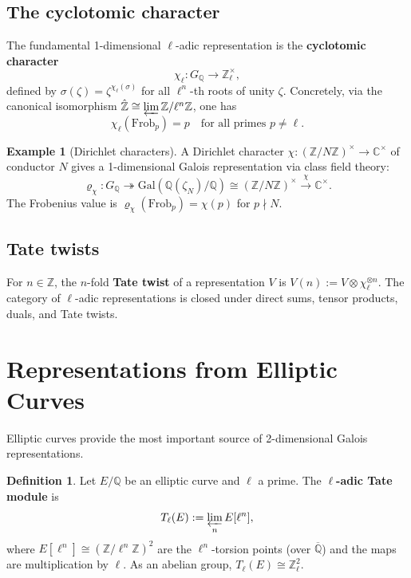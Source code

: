 \documentclass[a4paper,12pt]{amsart}
\theoremstyle{definition}
\newtheorem{definition}[theorem]{Definition}
\newtheorem{example}[theorem]{Example}
\theoremstyle{remark}
\newcommand{\Q}{\mathbb{Q}}
\newcommand{\Z}{\mathbb{Z}}
\newcommand{\Zl}{\mathbb{Z}_\ell}
\newcommand{\Qbar}{\overline{\mathbb{Q}}}
\newcommand{\Frob}{\mathrm{Frob}}
\newcommand{\Tl}{T_\ell}
\begin{document}
\subsection{The cyclotomic character}

The fundamental 1-dimensional $\ell$-adic representation is the \textbf{cyclotomic
character}
\[
  \chi_\ell\colon G_\Q \to \Zl^\times,
\]
defined by $\sigma(\zeta) = \zeta^{\chi_\ell(\sigma)}$ for all $\ell^n$-th roots of
unity $\zeta$. Concretely, via the canonical isomorphism
$\hat{\Z} \cong \varprojlim \Z/\ell^n\Z$, one has
\[
  \chi_\ell(\Frob_p) = p \quad \text{for all primes } p \neq \ell.
\]

\begin{example}[Dirichlet characters]
A Dirichlet character $\chi\colon (\Z/N\Z)^\times \to \mathbb{C}^\times$ of conductor
$N$ gives a 1-dimensional Galois representation via class field theory:
\[
  \varrho_\chi\colon G_\Q \twoheadrightarrow \mathrm{Gal}(\Q(\zeta_N)/\Q) \cong (\Z/N\Z)^\times
  \xrightarrow{\chi} \mathbb{C}^\times.
\]
The Frobenius value is $\varrho_\chi(\Frob_p) = \chi(p)$ for $p \nmid N$.
\end{example}

\subsection{Tate twists}

For $n \in \Z$, the $n$-fold \textbf{Tate twist} of a representation $V$ is
$V(n) := V \otimes \chi_\ell^{\otimes n}$. The category of $\ell$-adic representations
is closed under direct sums, tensor products, duals, and Tate twists.

\section{Representations from Elliptic Curves}
\label{sec:elliptic-curves}

Elliptic curves provide the most important source of 2-dimensional Galois representations.

\begin{definition}
Let $E/\Q$ be an elliptic curve and $\ell$ a prime. The \textbf{$\ell$-adic Tate
module} is
\[
  \Tl(E) := \varprojlim_n E[\ell^n],
\]
where $E[\ell^n] \cong (\Z/\ell^n\Z)^2$ are the $\ell^n$-torsion points (over $\Qbar$)
and the maps are multiplication by $\ell$. As an abelian group,
$\Tl(E) \cong \Zl^2$.
\end{definition}
\end{document}
